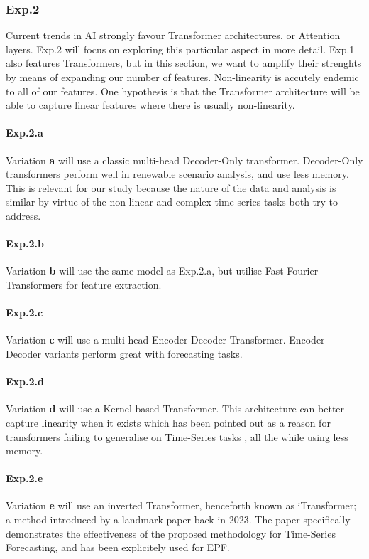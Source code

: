 \subsubsection{Exp.2}

Current trends in AI strongly favour Transformer architectures, or Attention layers. Exp.2 will focus on exploring this particular aspect in more detail. Exp.1 also features Transformers, but in this section, we want to 
amplify their strenghts by means of expanding our number of features. Non-linearity is accutely endemic to all of our features\cite{Manero2018}. One hypothesis is that the Transformer architecture will be able to
capture linear features where there is usually non-linearity.

\paragraph{Exp.2.a}
Variation \textbf{a} will use a classic multi-head Decoder-Only transformer\cite{Oliveira2023}. Decoder-Only transformers perform well in renewable scenario analysis, and use less memory\cite{Hussan2026-dy}. This 
is relevant for our study because the nature of the data and analysis is similar by virtue of the non-linear and complex time-series tasks both try to address.

\paragraph{Exp.2.b}
Variation \textbf{b} will use the same model as Exp.2.a, but utilise Fast Fourier Transformers for feature extraction\cite{Yemets2025}.

\paragraph{Exp.2.c}
Variation \textbf{c} will use a multi-head Encoder-Decoder Transformer. Encoder-Decoder variants perform great with forecasting tasks\cite{Hussan2026-dy}.

\paragraph{Exp.2.d}
Variation \textbf{d} will use a Kernel-based Transformer. This architecture can better capture linearity when it exists\cite{su2019kernel} which has been pointed out as a reason for transformers failing to generalise on Time-Series tasks\cite{curseOfAttention}
, all the while using less memory.

\paragraph{Exp.2.e}
Variation \textbf{e} will use an inverted Transformer, henceforth known as iTransformer; a method introduced by a landmark paper back in 2023\cite{iTrans}. The paper specifically demonstrates the effectiveness of the 
proposed methodology for Time-Series Forecasting, and has been explicitely used for EPF\cite{Wang2026}.
